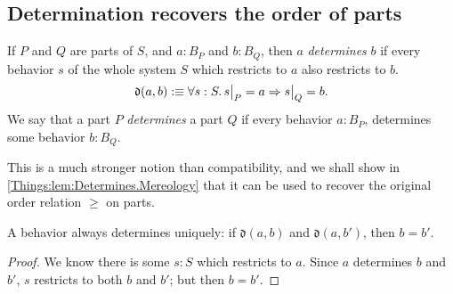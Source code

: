 \subsection{Determination recovers the order of parts}
\begin{defn}
If $P$ and $Q$ are parts of $S$, and $a : B_P$ and $b : B_Q$, then $a$ \emph{determines} $b$ if every behavior $s$ of the whole system $S$ which restricts to $a$ also restricts to $b$.
$$\mathfrak{d}(a, b) :\equiv \forall s : S.\, s\big|_{P} = a \Rightarrow s\big|_{Q} = b.$$
We say that a part $P$ \emph{determines} a part $Q$ if every behavior $a : B_P$, determines some behavior $b : B_Q$. 
\end{defn}

This is a much stronger notion than compatibility, and we shall show in \cref{Things:lem:Determines.Mereology} that it can be used to recover the original order relation $\geq$ on parts.

\begin{lemma}
A behavior always determines uniquely: if $\mathfrak{d}(a, b)$ and $\mathfrak{d}(a, b')$, then $b = b'$.
\end{lemma}
\begin{proof}
We know there is some $s : S$ which restricts to $a$. Since $a$ determines $b$ and $b'$, $s$ restricts to both $b$ and $b'$; but then $b = b'$.
\end{proof}


